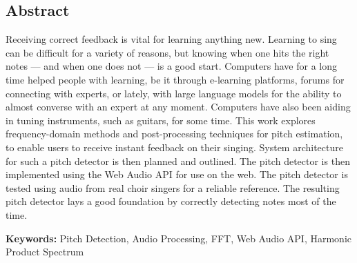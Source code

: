 \begin{center}
\subsection*{Abstract}
\end{center}
Receiving correct feedback is vital for learning anything new. Learning to sing can be difficult for a variety of reasons, but knowing when one hits the right notes — and when one does not — is a good start. Computers have for a long time helped people with learning, be it through e-learning platforms, forums for connecting with experts, or lately, with large language models for the ability to almost converse with an expert at any moment. Computers have also been aiding in tuning instruments, such as guitars, for some time. This work explores frequency-domain methods and post-processing techniques for pitch estimation, to enable users to receive instant feedback on their singing. System architecture for such a pitch detector is then planned and outlined. The pitch detector is then implemented using the Web Audio API for use on the web. The pitch detector is tested using audio from real choir singers for a reliable reference. The resulting pitch detector lays a good foundation by correctly detecting notes most of the time.   

\vspace{2cm}

\noindent \textbf{Keywords:} Pitch Detection, Audio Processing, FFT, Web Audio API, Harmonic Product Spectrum

\newpage 
